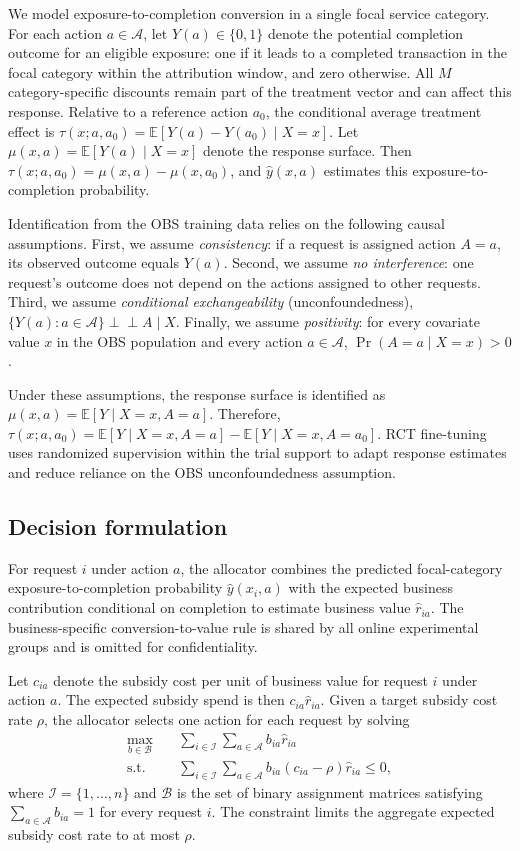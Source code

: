 \documentclass[sigconf,nonacm]{acmart}
\begin{document}
We model exposure-to-completion conversion in a single focal service category. For each action
$a\in\mathcal A$, let $Y(a)\in\{0,1\}$ denote the potential completion
outcome for an eligible exposure: one if it leads to a completed transaction
in the focal category within the attribution window, and zero otherwise. All $M$ category-specific discounts remain part of the treatment
vector and can affect this response. Relative to a reference action $a_0$,
the conditional average treatment effect is
$\tau(x;a,a_0)=\mathbb E[Y(a)-Y(a_0)\mid X=x]$.
Let $\mu(x,a)=\mathbb E[Y(a)\mid X=x]$ denote the response surface.
Then $\tau(x;a,a_0)=\mu(x,a)-\mu(x,a_0)$, and
$\hat y(x,a)$ estimates this exposure-to-completion probability.

Identification from the OBS training data relies on the following causal assumptions. First, we assume
\emph{consistency}: if a request is assigned action $A=a$, its observed
outcome equals $Y(a)$. Second, we assume \emph{no interference}: one
request's outcome does not depend on the actions assigned to other requests.
Third, we assume \emph{conditional exchangeability} (unconfoundedness),
$\{Y(a):a\in\mathcal A\}\perp\!\!\!\perp A\mid X$. Finally, we assume
\emph{positivity}: for every covariate value $x$ in the OBS population and
every action $a\in\mathcal A$, $\Pr(A=a\mid X=x)>0$.

Under these assumptions, the response surface is identified as
$\mu(x,a)=\mathbb E[Y\mid X=x,A=a]$. Therefore,
$\tau(x;a,a_0)=\mathbb E[Y\mid X=x,A=a]
-\mathbb E[Y\mid X=x,A=a_0]$.
RCT fine-tuning uses randomized supervision within the trial support to adapt
response estimates and reduce reliance on the OBS unconfoundedness assumption.

\subsection{Decision formulation}

For request $i$ under action $a$, the allocator combines the predicted focal-category
exposure-to-completion probability $\hat y(x_i,a)$ with the expected business
contribution conditional on completion to estimate business value $\hat r_{ia}$.
The business-specific conversion-to-value rule is shared by all online
experimental groups and is omitted for confidentiality.

Let $c_{ia}$ denote the subsidy cost per unit of business value for request
$i$ under action $a$. The expected subsidy spend is then
$c_{ia}\hat r_{ia}$. Given a target subsidy cost rate $\rho$, the allocator
selects one action for each request by solving
\begin{align}
\label{eq:allocation-lp}
    \max_{b\in\mathcal B}\quad
    &\sum_{i\in\mathcal I}\sum_{a\in\mathcal A}
    b_{ia}\hat r_{ia} \\
    \text{s.t.}\quad
    &\sum_{i\in\mathcal I}\sum_{a\in\mathcal A}
    b_{ia}(c_{ia}-\rho)\hat r_{ia}\leq 0,
\end{align}
where $\mathcal I=\{1,\ldots,n\}$ and $\mathcal B$ is the set of binary
assignment matrices satisfying $\sum_{a\in\mathcal A}b_{ia}=1$ for every
request $i$. The constraint limits the aggregate expected subsidy cost rate
to at most $\rho$.
\end{document}
